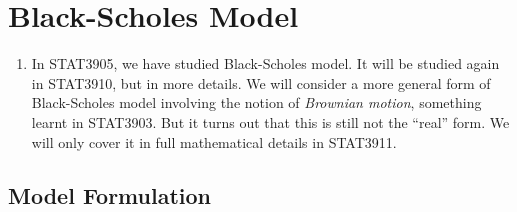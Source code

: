 \section{Black-Scholes Model}
\label{sect:bs-model}
\begin{enumerate}
\item In STAT3905, we have studied Black-Scholes model. It will be studied
again in STAT3910, but in more details. We will consider a more general form of
Black-Scholes model involving the notion of \emph{Brownian motion}, something
learnt in STAT3903. But it turns out that this is still not the ``real'' form.
We will only cover it in full mathematical details in STAT3911.
\end{enumerate}
\subsection{Model Formulation}
